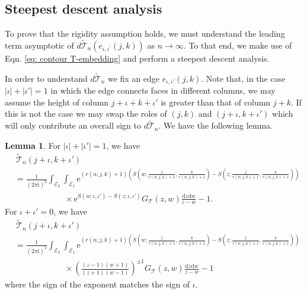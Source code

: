 \documentclass[12pt]{amsart}
\newcommand{\cT}{\mathcal T}
\newcommand{\io}{{\iota}}
\numberwithin{equation}{section}
\theoremstyle{definition}
\newtheorem{lemma}[thm]{Lemma}
\begin{document}
\subsection{Steepest descent analysis}
To prove that the rigidity assumption holds, we must understand the leading term asymptotic of $d \widetilde{\mathcal{T}}_n\left(e_{\iota, \iota^{\prime}}(j, k)\right)$ as $n\to \infty$. To that end, we make use of Eqn. \eqref{eq: contour T-embedding} and perform a steepest descent analysis. 

In order to understand $d\widetilde{\mathcal{T}}_n$ we fix an edge $e_{\io,\io'}(j,k)$. Note that, in the case $|\io|+|\io'|=1$ in which the edge connects faces in different columns, we may assume the height of column $j+\io+k+\io'$ is greater than that of column $j+k$. If this is not the case we may swap the roles of $(j,k)$ and $(j+\io,k+\io')$ which will only contribute an overall sign to $d\widetilde{\mathcal{T}}_n$. We have the following lemma.

\begin{lemma}
{For $|\io|+|\io'|=1$,} we have
\begin{equation}
\label{eq: perturbed_t_embedd_contour}
\begin{aligned}
      &\, \widetilde{\cT}_{n}(j+\io,k+\io')\\
      &= \frac{1}{(2 \pi \mathrm{i})^2} \int_{\mathcal{E}_2} \int_{\mathcal{E}_1} \mathrm e^{\left(r(n;j,k)+1\right)\left(S(w;\frac{j}{r(n;j,k)+1},\frac{k}{r(n;j,k)+1})-S(z;\frac{j}{r(n;j,k)+1},\frac{k}{r(n;j,k)+1})\right)} \\
      &\qquad \qquad\qquad \times \mathrm e^{S(w;\io,\io')- S(z;\io,\io')} G_{\mathcal{T}}(z, w) \frac{\mathrm d z\mathrm d w}{z-w}-1.
\end{aligned}
\end{equation}
{
For $\io+\io'=0$, we have
\begin{equation}
\label{eq: perturbed_t_embedd_contour2}
\begin{aligned}
      &\, \widetilde{\cT}_{n}(j+\io,k+\io')\\
      &= \frac{1}{(2 \pi \mathrm{i})^2} \int_{\mathcal{E}_2} \int_{\mathcal{E}_1} \mathrm e^{\left(r(n;j,k)+1\right)\left(S(w;\frac{j}{r(n;j,k)+1},\frac{k}{r(n;j,k)+1})-S(z;\frac{j}{r(n;j,k)+1},\frac{k}{r(n;j,k)+1})\right)} \\
      &\qquad \qquad\qquad \times  \left(\frac{(z-1)(w+1)}{(z+1)(w-1)}\right)^{\pm 1} G_{\mathcal{T}}(z, w) \frac{\mathrm d z\mathrm d w}{z-w}-1
\end{aligned}
\end{equation}
where the sign of the exponent matches the sign of $\io$.
}
\end{lemma}
\end{document}
